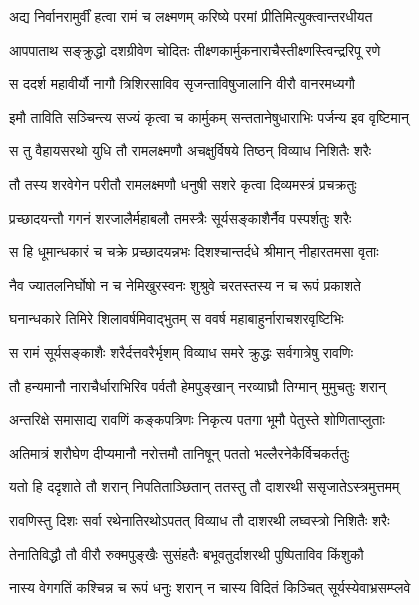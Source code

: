 \twolineshloka
{अद्य निर्वानरामुर्वीं हत्वा रामं च लक्ष्मणम्}
{करिष्ये परमां प्रीतिमित्युक्त्वान्तरधीयत} %

\twolineshloka
{आपपाताथ सङ्क्रुद्धो दशग्रीवेण चोदितः}
{तीक्ष्णकार्मुकनाराचैस्तीक्ष्णस्त्विन्द्ररिपू रणे} %

\twolineshloka
{स ददर्श महावीर्यौ नागौ त्रिशिरसाविव}
{सृजन्ताविषुजालानि वीरौ वानरमध्यगौ} %

\twolineshloka
{इमौ ताविति सञ्चिन्त्य सज्यं कृत्वा च कार्मुकम्}
{सन्ततानेषुधाराभिः पर्जन्य इव वृष्टिमान्} %

\twolineshloka
{स तु वैहायसरथो युधि तौ रामलक्ष्मणौ}
{अचक्षुर्विषये तिष्ठन् विव्याध निशितैः शरैः} %

\twolineshloka
{तौ तस्य शरवेगेन परीतौ रामलक्ष्मणौ}
{धनुषी सशरे कृत्वा दिव्यमस्त्रं प्रचक्रतुः} %

\twolineshloka
{प्रच्छादयन्तौ गगनं शरजालैर्महाबलौ}
{तमस्त्रैः सूर्यसङ्काशैर्नैव पस्पर्शतुः शरैः} %

\twolineshloka
{स हि धूमान्धकारं च चक्रे प्रच्छादयन्नभः}
{दिशश्चान्तर्दधे श्रीमान् नीहारतमसा वृताः} %

\twolineshloka
{नैव ज्यातलनिर्घोषो न च नेमिखुरस्वनः}
{शुश्रुवे चरतस्तस्य न च रूपं प्रकाशते} %

\twolineshloka
{घनान्धकारे तिमिरे शिलावर्षमिवाद्भुतम्}
{स ववर्ष महाबाहुर्नाराचशरवृष्टिभिः} %

\twolineshloka
{स रामं सूर्यसङ्काशैः शरैर्दत्तवरैर्भृशम्}
{विव्याध समरे क्रुद्धः सर्वगात्रेषु रावणिः} %

\twolineshloka
{तौ हन्यमानौ नाराचैर्धाराभिरिव पर्वतौ}
{हेमपुङ्खान् नरव्याघ्रौ तिग्मान् मुमुचतुः शरान्} %

\twolineshloka
{अन्तरिक्षे समासाद्य रावणिं कङ्कपत्रिणः}
{निकृत्य पतगा भूमौ पेतुस्ते शोणिताप्लुताः} %

\twolineshloka
{अतिमात्रं शरौघेण दीप्यमानौ नरोत्तमौ}
{तानिषून् पततो भल्लैरनेकैर्विचकर्ततुः} %

\twolineshloka
{यतो हि ददृशाते तौ शरान् निपतिताञ्छितान्}
{ततस्तु तौ दाशरथी ससृजातेऽस्त्रमुत्तमम्} %

\twolineshloka
{रावणिस्तु दिशः सर्वा रथेनातिरथोऽपतत्}
{विव्याध तौ दाशरथी लघ्वस्त्रो निशितैः शरैः} %

\twolineshloka
{तेनातिविद्धौ तौ वीरौ रुक्मपुङ्खैः सुसंहतैः}
{बभूवतुर्दाशरथी पुष्पिताविव किंशुकौ} %

\twolineshloka
{नास्य वेगगतिं कश्चिन्न च रूपं धनुः शरान्}
{न चास्य विदितं किञ्चित् सूर्यस्येवाभ्रसम्प्लवे} %

